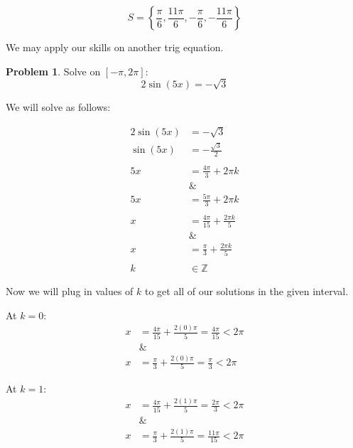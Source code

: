 \documentclass[12pt]{article}
\theoremstyle{definition}
\newtheorem{problem}{Problem}
\begin{document}
\begin{equation}
    S = \left\{ \frac{\pi}{6}, \frac{11\pi}{6}, -\frac{\pi}{6}, -\frac{11\pi}{6} \right\}
\end{equation}

We may apply our skills on another trig equation.

\begin{problem}
Solve on $\displaystyle [-\pi, 2\pi]$:
\begin{equation*}
    2\sin(5x) = -\sqrt{3} \label{eq:3}
\end{equation*}
\end{problem}

We will solve as follows:

\begin{align}
    2\sin(5x) & = -\sqrt{3}                          \\
    \sin(5x)  & = -\frac{\sqrt{3}}{2}                \\
    \nonumber                                        \\
    5x        & = \frac{4\pi}{3} + 2\pi k            \\
              & \&                                   \\
    5x        & = \frac{5\pi}{3} + 2\pi k            \\
    \nonumber                                        \\
    x         & = \frac{4\pi}{15} + \frac{2\pi k}{5} \\
              & \&                                   \\
    x         & = \frac{\pi}{3} + \frac{2\pi k}{5}   \\
    \nonumber                                        \\
    k         & \in \mathbb{Z}
\end{align}

Now we will plug in values of $k$ to get all of our solutions in the given interval.

At $k=0$:
\begin{align}
    x & =\frac{4\pi}{15} + \frac{2(0)\pi}{5} = \frac{4\pi}{15} < 2\pi \\
      & \&                                                            \\
    x & =\frac{\pi}{3} + \frac{2(0)\pi}{5} = \frac{\pi}{3} < 2\pi
\end{align}

At $k=1$:
\begin{align}
    x & =\frac{4\pi}{15} + \frac{2(1)\pi}{5} = \frac{2\pi}{3} < 2\pi \\
      & \&                                                           \\
    x & =\frac{\pi}{3} + \frac{2(1)\pi}{5} = \frac{11\pi}{15} < 2\pi
\end{align}
\end{document}
